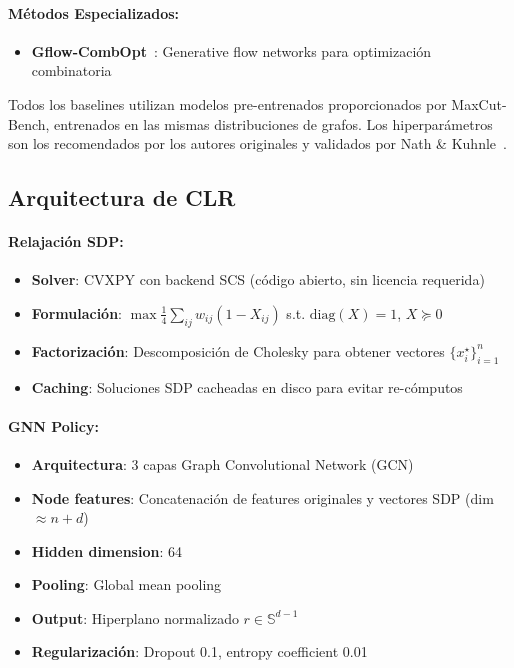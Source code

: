 \documentclass{article}
\begin{document}
\paragraph{Métodos Especializados:}
\begin{itemize}
    \item \textbf{Gflow-CombOpt}~\cite{jain2022biological}: Generative flow networks para optimización combinatoria
\end{itemize}

Todos los baselines utilizan modelos pre-entrenados proporcionados por MaxCut-Bench, entrenados en las mismas distribuciones de grafos. Los hiperparámetros son los recomendados por los autores originales y validados por Nath \& Kuhnle~\cite{nath2024benchmarkmaximumcutstandardization}.

\subsection{Arquitectura de CLR}

\paragraph{Relajación SDP:}
\begin{itemize}
    \item \textbf{Solver}: CVXPY con backend SCS (código abierto, sin licencia requerida)
    \item \textbf{Formulación}: $\max \frac{1}{4} \sum_{ij} w_{ij}(1 - X_{ij})$ s.t. $\text{diag}(X) = 1$, $X \succeq 0$
    \item \textbf{Factorización}: Descomposición de Cholesky para obtener vectores $\{x_i^\star\}_{i=1}^n$
    \item \textbf{Caching}: Soluciones SDP cacheadas en disco para evitar re-cómputos
\end{itemize}

\paragraph{GNN Policy:}
\begin{itemize}
    \item \textbf{Arquitectura}: 3 capas Graph Convolutional Network (GCN)
    \item \textbf{Node features}: Concatenación de features originales y vectores SDP (dim $\approx n + d$)
    \item \textbf{Hidden dimension}: 64
    \item \textbf{Pooling}: Global mean pooling
    \item \textbf{Output}: Hiperplano normalizado $r \in \mathbb{S}^{d-1}$
    \item \textbf{Regularización}: Dropout 0.1, entropy coefficient 0.01
\end{itemize}
\end{document}
